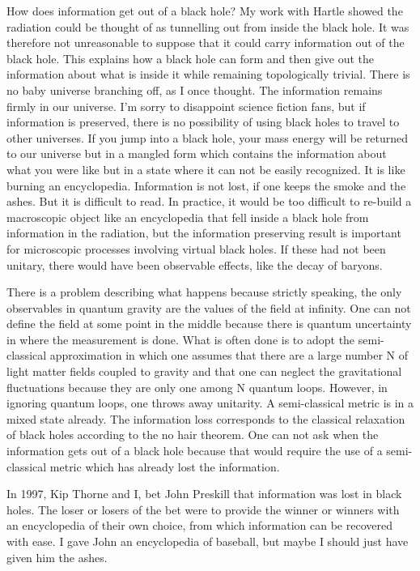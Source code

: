 \documentclass[aps,prd,groupedaddress,showpacs]{revtex4}
\begin{document}
How does information get out of a black hole? My work with Hartle\cite{HartleHawking} showed the radiation could be thought of as tunnelling out from inside the black hole. It was therefore not unreasonable to suppose that it could carry information out of the black hole.  This explains how a black hole can form and then give out the information about what is inside it while remaining topologically trivial. There is no baby universe branching off, as I once thought. The information remains firmly in our universe. I'm sorry to disappoint science fiction fans, but if information is preserved, there is no possibility of using black holes to travel to other universes. If you jump into a black hole, your mass energy will be returned to our universe but in a mangled form which contains the information about what you were like but in a  state where it can not be easily recognized.  It is like burning an encyclopedia. Information is not lost, if one keeps the smoke and the ashes. But it is difficult to read. In practice, it would be too difficult to re-build a macroscopic object like an encyclopedia that fell inside a black hole from information in the radiation, but the information preserving result is important for microscopic processes involving virtual black holes. If these had not been unitary, there would have been observable effects, like the decay of baryons. 



There is a problem describing what happens because strictly speaking, the only observables in quantum gravity are the values of the field at infinity. One can not define the field at some point in the middle because there is quantum uncertainty in where the measurement is done. What is often done is to adopt the semi-classical approximation in which one assumes that there are a large number N of light matter fields coupled to gravity and that one can neglect the gravitational fluctuations because they are only one among N quantum loops. However, in ignoring quantum loops, one throws away unitarity. A semi-classical metric is in a mixed state already. The information loss corresponds to the classical relaxation of black holes according to the no hair theorem. One can not ask when the information gets out of a black hole because that would require the use of a semi-classical metric which has already lost the information. 

  

In 1997, Kip Thorne and I,  bet John Preskill that information was lost in black holes. The loser or losers of the bet  were to provide the winner or winners with an encyclopedia of their own choice, from which information can be recovered with ease. I gave John an encyclopedia of baseball, but maybe I should just have given him the ashes.
\end{document}

